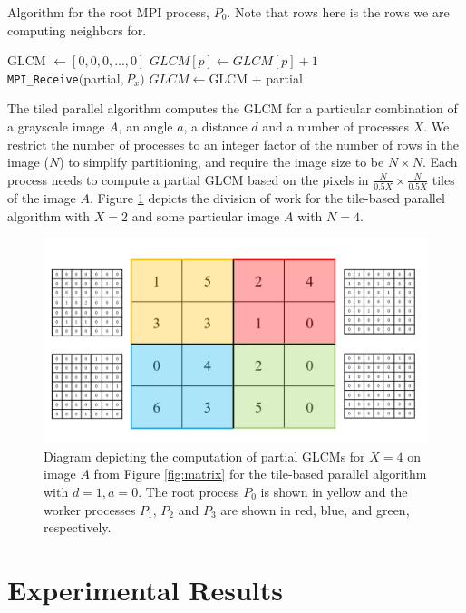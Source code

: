 \documentclass{article}
\begin{document}
\begin{algorithm}
    \caption{Algorithm for the root MPI process, $P_0$. Note that rows here is the rows we are computing neighbors for.}\label{alg:2}
    \begin{algorithmic}
        \State GLCM $\gets [0, 0, 0, ..., 0]$
            \State $GLCM[p] \gets GLCM[p] + 1$
        \EndIf
        \EndWhile \\
            \State \texttt{MPI\_Receive}$($partial$, P_x)$
            \State $GLCM \gets $GLCM + partial
        \EndFor
    \end{algorithmic}
\end{algorithm}
    The tiled parallel algorithm computes the GLCM for a particular combination of a grayscale image $A$, an angle $a$, a distance $d$ and a number of processes $X$. We restrict the number of processes to an integer factor of the number of rows in the image ($N$) to simplify partitioning, and require the image size to be $N \times N$. Each process needs to compute a partial GLCM based on the pixels in $\frac{N}{0.5X} \times \frac{N}{0.5X}$ tiles of the image $A$. Figure \ref{fig:tiles} depicts the division of work for the tile-based parallel algorithm with $X = 2$ and some particular image $A$ with $N = 4$.
\begin{figure}[b]
      \includegraphics[width=\linewidth]{tile_partitioning.jpg}
      \caption{Diagram depicting the computation of partial GLCMs for $X = 4$ on image $A$ from Figure \ref{fig:matrix} for the tile-based parallel algorithm with $d = 1, a = 0$. The root process $P_0$ is shown in yellow and the worker processes $P_1$, $P_2$ and $P_3$ are shown in red, blue, and green, respectively. }
      \label{fig:tiles}
    \end{figure}
\section{Experimental Results}
\end{document}
